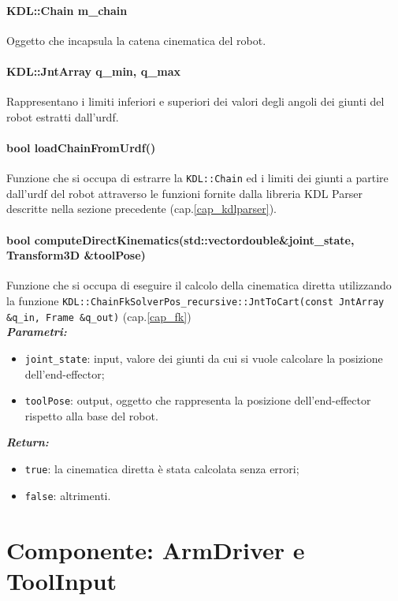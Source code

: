 \paragraph{KDL::Chain m\_chain}
Oggetto che incapsula la catena cinematica del robot.

\paragraph{KDL::JntArray q\_min, q\_max}
Rappresentano i limiti inferiori e superiori dei valori degli angoli dei giunti del robot estratti dall'urdf.

\paragraph{bool loadChainFromUrdf()}
Funzione che si occupa di estrarre la \texttt{KDL::Chain} ed i limiti dei giunti a partire dall'urdf del robot attraverso le funzioni fornite dalla libreria KDL Parser descritte nella sezione precedente (cap.\ref{cap_kdlparser}).

\paragraph{bool computeDirectKinematics(std::vector\tl double\tr \&joint\_state, Transform3D \&toolPose)}
Funzione che si occupa di eseguire il calcolo della cinematica diretta utilizzando la funzione \texttt{KDL::ChainFkSolverPos\_recursive::JntToCart(const JntArray \&q\_in, Frame \&q\_out)} (cap.\ref{cap_fk})\\
\textbf{\textit{Parametri:}}
\begin{itemize}
	\item \texttt{joint\_state}: input, valore dei giunti da cui si vuole calcolare la posizione dell'end-effector; 
	\item \texttt{toolPose}: output, oggetto che rappresenta la posizione dell'end-effector rispetto alla base del robot.
\end{itemize}
\textbf{\textit{Return:}}
\begin{itemize}
	\item \texttt{true}: la cinematica diretta è stata calcolata senza errori;
	\item \texttt{false}: altrimenti.
\end{itemize}


\section{Componente: ArmDriver e ToolInput}
